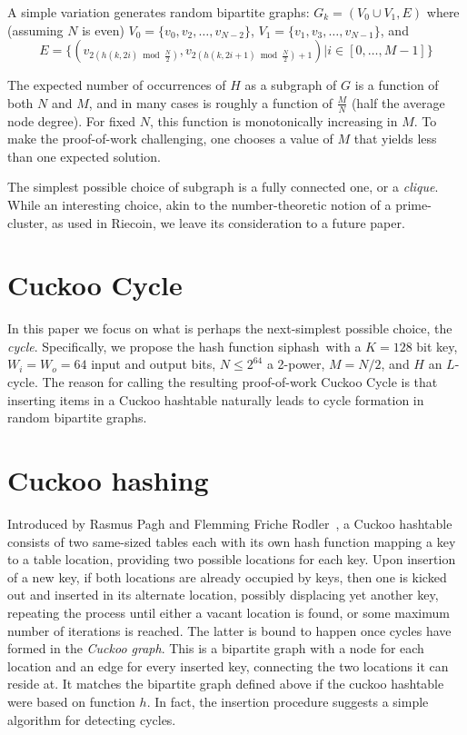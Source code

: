 \documentclass[11pt, oneside]{article}
\newcommand{\hash}{{\rm siphash}}
\begin{document}
A simple variation generates random bipartite graphs: $G_k = (V_0 \cup V_1,E)$ where (assuming $N$ is even)
$V_0=\{v_0,v_2,\ldots,v_{N-2}\}$, $V_1=\{v_1,v_3,\ldots,v_{N-1}\}$, and
\begin{equation}
\label{hash_edges}
E=\{(v_{2(h(k,2i) \bmod \frac{N}{2})}, v_{2(h(k,2i+1) \bmod \frac{N}{2})+1}) | i \in [0,\ldots,M-1]\}
\end{equation}

The expected number of occurrences of $H$ as a subgraph of $G$ is a function of both $N$ and $M$,
and in many cases is roughly a function of $\frac{M}{N}$ (half the average node degree).
For fixed $N$, this function is monotonically increasing in $M$.
To make the proof-of-work challenging, one chooses a value of $M$ that yields less than one
expected solution.

The simplest possible choice of subgraph is a fully connected one, or a {\em clique}.
While an interesting choice, akin to the number-theoretic notion of a prime-cluster,
as used in Riecoin, we leave its consideration to a future paper.

\section{Cuckoo Cycle}
In this paper we focus on what is perhaps the next-simplest possible choice, the {\em cycle}.
Specifically, we propose the hash function \hash\ with a $K=128$ bit key, $W_i = W_o = 64$ input
and output bits, $N \leq 2^{64}$ a 2-power, $M=N/2$, and $H$ an $L$-cycle.
The reason for calling the resulting proof-of-work Cuckoo Cycle is that
inserting items in a Cuckoo hashtable naturally leads to cycle formation
in random bipartite graphs.

\section{Cuckoo hashing}
Introduced by Rasmus Pagh and Flemming Friche
Rodler~\cite{Pagh04cuckoohashing}, a Cuckoo hashtable consists of two
same-sized tables each with its own hash function mapping a key to a table
location, providing two possible locations for each key.
Upon insertion of a new key, if both locations are already occupied by keys,
then one is kicked out and inserted in its alternate location, possibly
displacing yet another key, repeating the process until either a vacant
location is found, or some maximum number of iterations is reached.
The latter is bound to happen once cycles have formed in the {\em Cuckoo graph}.
This is a bipartite graph with a node for each location and an
edge for every inserted key, connecting the two locations it can reside at.
It matches the bipartite graph defined above if the cuckoo hashtable
were based on function $h$.
In fact, the insertion procedure suggests a simple algorithm for detecting cycles.
\end{document}
